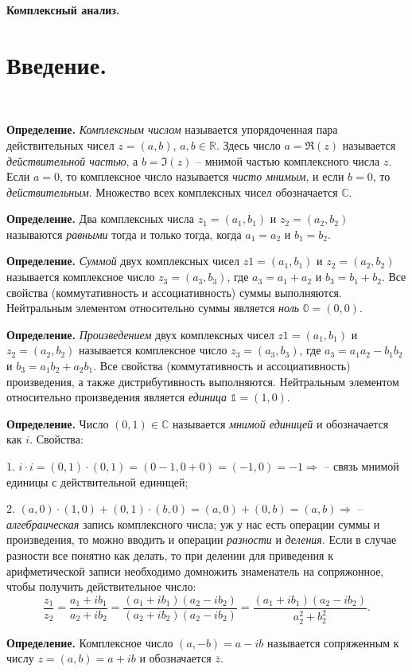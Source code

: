 \documentclass[9pt]{article}
\begin{document}
\begin{center}
    \huge\textbf{Комплексный анализ.}
\end{center}

\section{Введение.}

\par\ 
\par\textbf{Определение.} \textit{Комплексным числом} называется упорядоченная пара действительных чисел \(z=(a,b)\), \(a,b\in\mathbb{R}\). Здесь число \(a=\Re(z)\) называется \textit{действительной частью}, а \(b=\Im(z)\) -- мнимой частью комплексного числа \(z\). Если \(a=0\), то комплексное число называется \textit{чисто мнимым}, и если \(b=0\), то \textit{действительным}. Множество всех комплексных чисел обозначается \(\mathbb{C}\).
\par\textbf{Определение.} Два комплексных числа \(z_1=(a_1,b_1)\) и \(z_2=(a_2,b_2)\) называются \textit{равными} тогда и только тогда, когда \(a_1=a_2\) и \(b_1=b_2\).
\par\textbf{Определение.} \textit{Суммой} двух комплексных чисел \(z1=(a_1,b_1)\) и \(z_2=(a_2,b_2)\) называется комплексное число \(z_3=(a_3,b_3)\), где \(a_3=a_1+a_2\) и \(b_3=b_1+b_2\). Все свойства (коммутативность и ассоциативность) суммы выполняются. Нейтральным элементом относительно суммы является \textit{ноль} \(\mathbb{0}=(0,0)\).
\par\textbf{Определение.} \textit{Произведением} двух комплексных чисел \(z1=(a_1,b_1)\) и \(z_2=(a_2,b_2)\) называется комплексное число \(z_3=(a_3,b_3)\), где \(a_3=a_1a_2-b_1b_2\) и \(b_3=a_1b_2+a_2b_1\). Все свойства (коммутативность и ассоциативность) произведения, а также дистрибутивность выполняются. Нейтральным элементом относительно произведения является \textit{единица} \(\mathbb{1}=(1,0)\).
\par\textbf{Определение.} Число \((0,1)\in\mathbb{C}\) называется \textit{мнимой единицей} и обозначается как \(i\). Свойства:
\par1. \(i\cdot i=(0,1)\cdot(0,1)=(0-1,0+0)=(-1,0)=-1 \Rightarrow\) \boxed{i\cdot i=-1} -- связь мнимой единицы с действительной единицей;
\par2. \((a,0)\cdot(1,0)+(0,1)\cdot(b,0)=(a,0)+(0,b)=(a,b) \Rightarrow\) \boxed{z=a+i\cdot b} -- \textit{алгебраическая} запись комплексного числа;
\parРаз уж у нас есть операции суммы и произведения, то можно вводить и операции \textit{разности} и \textit{деления}. Если в случае разности все понятно как делать, то при делении для приведения к арифметической записи необходимо домножить знаменатель на сопряжонное, чтобы получить действительное число: \[\dfrac{z_1}{z_2}=\dfrac{a_1+ib_1}{a_2+ib_2}=\dfrac{(a_1+ib_1)(a_2-ib_2)}{(a_2+ib_2)(a_2-ib_2)}=\dfrac{(a_1+ib_1)(a_2-ib_2)}{a_2^2+b_2^2}.\]
\par\textbf{Определение.} Комплексное число \((a,-b)=a-ib\) называется сопряженным к числу \(z=(a,b)=a+ib\) и обозначается \(\overline{z}\).
\end{document}
